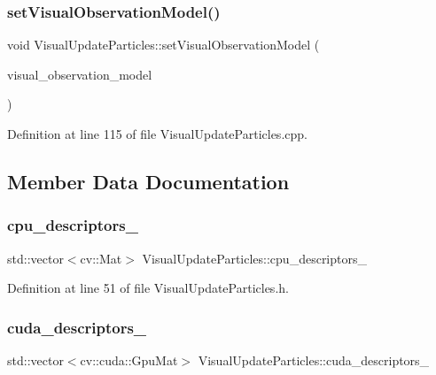 \subsubsection{\texorpdfstring{set\+Visual\+Observation\+Model()}{setVisualObservationModel()}}
{\footnotesize\ttfamily void Visual\+Update\+Particles\+::set\+Visual\+Observation\+Model (\begin{DoxyParamCaption}\item[{std\+::unique\+\_\+ptr$<$ bfl\+::\+Visual\+Observation\+Model $>$}]{visual\+\_\+observation\+\_\+model }\end{DoxyParamCaption})\hspace{0.3cm}{\ttfamily [override]}}



Definition at line 115 of file Visual\+Update\+Particles.\+cpp.



\subsection{Member Data Documentation}
\mbox{\label{classVisualUpdateParticles_ac9c29a18fee44cd0bb5be0ff71e2f8d7}} 
\subsubsection{\texorpdfstring{cpu\+\_\+descriptors\+\_\+}{cpu\_descriptors\_}}
{\footnotesize\ttfamily std\+::vector$<$cv\+::\+Mat$>$ Visual\+Update\+Particles\+::cpu\+\_\+descriptors\+\_\+\hspace{0.3cm}{\ttfamily [protected]}}



Definition at line 51 of file Visual\+Update\+Particles.\+h.

\mbox{\label{classVisualUpdateParticles_ae2de27efd67d8c5cfa661d97841aa9ea}} 
\subsubsection{\texorpdfstring{cuda\+\_\+descriptors\+\_\+}{cuda\_descriptors\_}}
{\footnotesize\ttfamily std\+::vector$<$cv\+::cuda\+::\+Gpu\+Mat$>$ Visual\+Update\+Particles\+::cuda\+\_\+descriptors\+\_\+\hspace{0.3cm}{\ttfamily [protected]}}



